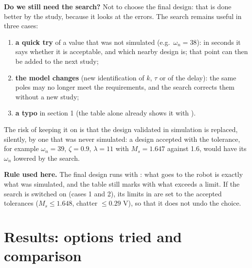 \documentclass[10pt,a4paper]{article}
\newcommand{\code}[1]{\texttt{\detokenize{#1}}}
\begin{document}
\textbf{Do we still need the search?} Not to choose the final design: that is done better by the study, because it
looks at the errors. The search remains useful in three cases:
\begin{enumerate}
  \item \textbf{a quick try} of a value that was not simulated (e.g.\ $\omega_n=38$): in seconds it says whether it is
        acceptable, and which nearby design is; that point can then be added to the next study;
  \item \textbf{the model changes} (new identification of $k$, $\tau$ or of the delay): the same poles may no longer
        meet the requirements, and the search corrects them without a new study;
  \item \textbf{a typo} in section 1 (the table alone already shows it with \code{*}).
\end{enumerate}
The risk of keeping it on is that the design validated in simulation is replaced, silently, by one that was never
simulated: a design accepted with the tolerance, for example $\omega_n=39$, $\zeta=0.9$, $\lambda=11$ with
$M_s=1.647$ against 1.6, would have its $\omega_n$ lowered by the search.

\textbf{Rule used here.} The final design runs with \code{do_search = false}: what goes to the robot is exactly what was
simulated, and the table still marks with \code{*} what exceeds a limit. If the search is switched on (cases 1 and 2), its
limits in \code{design_pp.m} are set to the accepted tolerances ($M_s\leq1.648$, chatter $\leq0.29$ V), so that it does not
undo the choice.

\section{Results: options tried and comparison}\label{sec:result}
\end{document}
